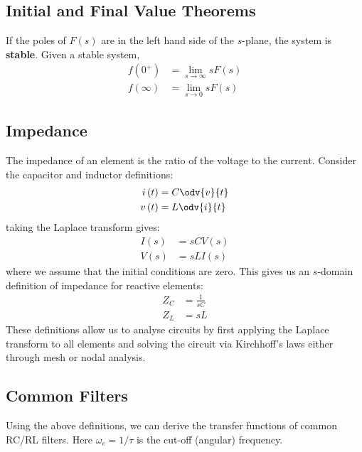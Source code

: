 \documentclass{article}
\begin{document}
\subsection{Initial and Final Value Theorems}
If the poles of \(F\left( s \right)\) are in the left hand side of the
\(s\)-plane, the system is \textbf{stable}. Given a stable system,
\begin{align*}
    f\left( 0^{+} \right)  & = \lim_{s \to \infty} s F\left( s \right) \\
    f\left( \infty \right) & = \lim_{s \to 0} s F\left( s \right)
\end{align*}
\subsection{Impedance}
The impedance of an element is the ratio of the voltage to the current.
Consider the capacitor and inductor definitions:
\begin{align*}
    i\left( t \right) & = C \odv{v}{t} \\
    v\left( t \right) & = L \odv{i}{t}
\end{align*}
taking the Laplace transform gives:
\begin{align*}
    I\left( s \right) & = sC V\left( s \right) \\
    V\left( s \right) & = sL I\left( s \right)
\end{align*}
where we assume that the initial conditions are zero. This gives us an \(s\)-domain definition of impedance for reactive elements:
\begin{align*}
    Z_C & = \frac{1}{sC} \\
    Z_L & = sL
\end{align*}
These definitions allow us to analyse circuits by first applying
the Laplace transform to all elements and solving the circuit via Kirchhoff's laws either through mesh or nodal analysis.
\subsection{Common Filters}
Using the above definitions, we can derive the transfer functions of
common RC/RL filters. Here \(\omega_c = 1/\tau\) is the cut-off
(angular) frequency.
\end{document}
